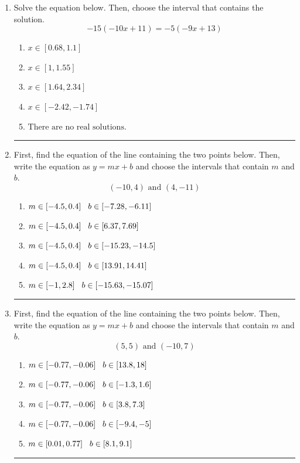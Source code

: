 \documentclass[14pt]{extbook}
\newcommand{\litem}[1]{\item#1\hspace*{-1cm}\rule{\textwidth}{0.4pt}}
\begin{document}
\begin{enumerate}
{\begin{enumerate}[label=\Alph*.]
\end{enumerate} }
\litem{
Solve the equation below. Then, choose the interval that contains the solution.\[ -15(-10x + 11) = -5(-9x + 13) \]\begin{enumerate}[label=\Alph*.]
\item \( x \in [0.68, 1.1] \)
\item \( x \in [1, 1.55] \)
\item \( x \in [1.64, 2.34] \)
\item \( x \in [-2.42, -1.74] \)
\item \( \text{There are no real solutions.} \)

\end{enumerate} }
\litem{
First, find the equation of the line containing the two points below. Then, write the equation as $ y=mx+b $ and choose the intervals that contain $m$ and $b$.\[ (-10, 4) \text{ and } (4, -11) \]\begin{enumerate}[label=\Alph*.]
\item \( m \in [-4.5, 0.4] \hspace*{3mm} b \in [-7.28, -6.11] \)
\item \( m \in [-4.5, 0.4] \hspace*{3mm} b \in [6.37, 7.69] \)
\item \( m \in [-4.5, 0.4] \hspace*{3mm} b \in [-15.23, -14.5] \)
\item \( m \in [-4.5, 0.4] \hspace*{3mm} b \in [13.91, 14.41] \)
\item \( m \in [-1, 2.8] \hspace*{3mm} b \in [-15.63, -15.07] \)

\end{enumerate} }
\litem{
First, find the equation of the line containing the two points below. Then, write the equation as $ y=mx+b $ and choose the intervals that contain $m$ and $b$.\[ (5, 5) \text{ and } (-10, 7) \]\begin{enumerate}[label=\Alph*.]
\item \( m \in [-0.77, -0.06] \hspace*{3mm} b \in [13.8, 18] \)
\item \( m \in [-0.77, -0.06] \hspace*{3mm} b \in [-1.3, 1.6] \)
\item \( m \in [-0.77, -0.06] \hspace*{3mm} b \in [3.8, 7.3] \)
\item \( m \in [-0.77, -0.06] \hspace*{3mm} b \in [-9.4, -5] \)
\item \( m \in [0.01, 0.77] \hspace*{3mm} b \in [8.1, 9.1] \)


\end{enumerate}}
\end{enumerate}
\end{document}
